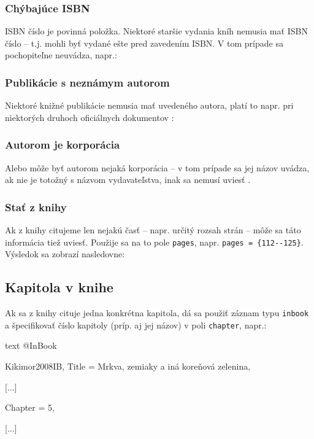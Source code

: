 \noindent[X] 

\subsubsection{Chýbajúce ISBN}

ISBN číslo je povinná položka. Niektoré staršie vydania kníh nemusia mať ISBN číslo -- t.j. mohli byť vydané ešte pred zavedením ISBN. V tom prípade sa pochopiteľne neuvádza, napr.:

\noindent[X] 

\subsubsection{Publikácie s neznámym autorom}

Niektoré knižné publikácie nemusia mať uvedeného autora, platí to napr. pri niektorých druhoch oficiálnych dokumentov \cite{boldis1}:

\noindent[X] 

\subsubsection{Autorom je korporácia}

Alebo môže byť autorom nejaká korporácia -- v tom prípade sa jej názov uvádza, ak nie je totožný s názvom vydavateľstva, inak sa nemusí uviesť \cite{boldis1}.

\subsubsection{Stať z knihy}

Ak z knihy citujeme len nejakú časť -- napr. určitý rozsah strán -- môže sa táto informácia tiež uviesť. Použije sa na to pole \texttt{pages}, napr. \texttt{pages = \{112{-}{-}125\}}. Výsledok sa zobrazí nasledovne:

\noindent[X] 

\subsection{Kapitola v knihe}

Ak sa z knihy cituje jedna konkrétna kapitola, dá sa použiť záznam typu \texttt{inbook} a špecifikovať číslo kapitoly (príp. aj jej názov) v poli \texttt{chapter}, napr.:
\begin{inlinecode}{text}
@InBook{Kikimor2008IB,
  Title                    = {Mrkva, zemiaky a iná koreňová zelenina},
  
  [...]
  
  Chapter                  = {5},
  
  [...]
  
}
\end{inlinecode}

